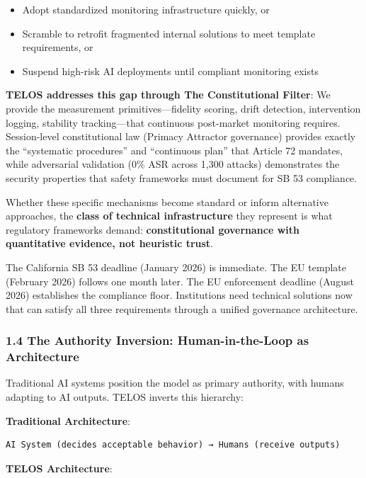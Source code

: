 \begin{itemize}
\tightlist
\item
  Adopt standardized monitoring infrastructure quickly, or
\item
  Scramble to retrofit fragmented internal solutions to meet template
  requirements, or
\item
  Suspend high-risk AI deployments until compliant monitoring exists
\end{itemize}

\textbf{TELOS addresses this gap through The Constitutional Filter}: We
provide the measurement primitives---fidelity scoring, drift detection,
intervention logging, stability tracking---that continuous post-market
monitoring requires. Session-level constitutional law (Primacy Attractor
governance) provides exactly the ``systematic procedures'' and
``continuous plan'' that Article 72 mandates, while adversarial
validation (0\% ASR across 1,300 attacks) demonstrates the security
properties that safety frameworks must document for SB 53 compliance.

Whether these specific mechanisms become standard or inform alternative
approaches, the \textbf{class of technical infrastructure} they
represent is what regulatory frameworks demand: \textbf{constitutional
governance with quantitative evidence, not heuristic trust}.

The California SB 53 deadline (January 2026) is immediate. The EU
template (February 2026) follows one month later. The EU enforcement
deadline (August 2026) establishes the compliance floor. Institutions
need technical solutions now that can satisfy all three requirements
through a unified governance architecture.

\subsubsection{1.4 The Authority Inversion: Human-in-the-Loop as
Architecture}\label{the-authority-inversion-human-in-the-loop-as-architecture}

Traditional AI systems position the model as primary authority, with
humans adapting to AI outputs. TELOS inverts this hierarchy:

\textbf{Traditional Architecture}:

\begin{verbatim}
AI System (decides acceptable behavior) → Humans (receive outputs)
\end{verbatim}

\textbf{TELOS Architecture}:

